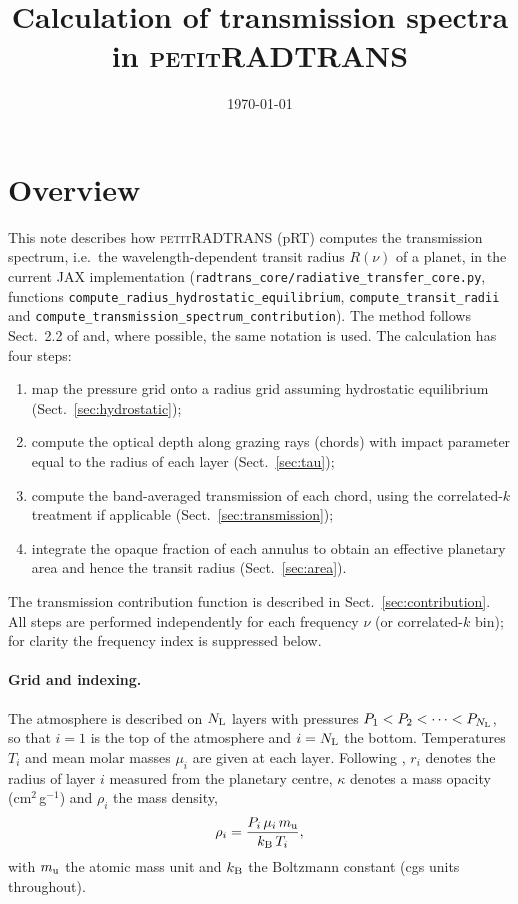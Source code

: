 \documentclass[11pt,a4paper]{article}
\title{Calculation of transmission spectra in \textsc{petitRADTRANS}}
\author{}
\date{\today}
\newcommand{\Ntot}{N_{\rm L}}
\newcommand{\code}[1]{\texttt{#1}}
\begin{document}
\maketitle

\section{Overview}

This note describes how \textsc{petitRADTRANS} (pRT) computes the transmission
spectrum, i.e.\ the wavelength-dependent transit radius $R(\nu)$ of a planet,
in the current JAX implementation
(\code{radtrans\_core/radiative\_transfer\_core.py}, functions
\code{compute\_radius\_hydrostatic\_equilibrium},
\code{compute\_transit\_radii} and
\code{compute\_transmission\_spectrum\_contribution}).
The method follows Sect.~2.2 of \citet{molliere2019} and, where possible, the
same notation is used. The calculation has four steps:
\begin{enumerate}
  \item map the pressure grid onto a radius grid assuming hydrostatic
        equilibrium (Sect.~\ref{sec:hydrostatic});
  \item compute the optical depth along grazing rays (chords) with
        impact parameter equal to the radius of each layer
        (Sect.~\ref{sec:tau});
  \item compute the band-averaged transmission of each chord, using the
        correlated-$k$ treatment if applicable (Sect.~\ref{sec:transmission});
  \item integrate the opaque fraction of each annulus to obtain an
        effective planetary area and hence the transit radius
        (Sect.~\ref{sec:area}).
\end{enumerate}
The transmission contribution function is described in
Sect.~\ref{sec:contribution}. All steps are performed independently for each
frequency $\nu$ (or correlated-$k$ bin); for clarity the frequency index is
suppressed below.

\paragraph{Grid and indexing.}
The atmosphere is described on $\Ntot$ layers with pressures
$P_1 < P_2 < \dots < P_{\Ntot}$, so that $i=1$ is the top of the atmosphere
and $i=\Ntot$ the bottom. Temperatures $T_i$ and mean molar masses $\mu_i$
are given at each layer. Following \citet{molliere2019}, $r_i$ denotes the
radius of layer $i$ measured from the planetary centre, $\kappa$ denotes a
mass opacity (cm$^2$\,g$^{-1}$) and $\rho_i$ the mass density,
\begin{equation}
  \rho_i = \frac{P_i\,\mu_i\,m_{\rm u}}{k_{\rm B}\,T_i},
  \label{eq:rho}
\end{equation}
with $m_{\rm u}$ the atomic mass unit and $k_{\rm B}$ the Boltzmann constant
(cgs units throughout).
\end{document}
